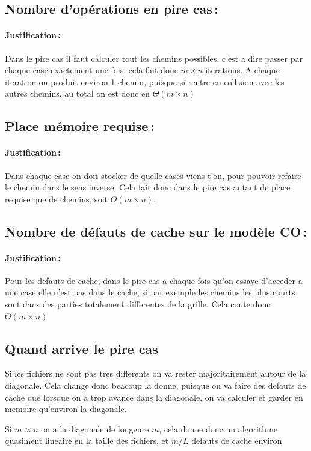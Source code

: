 \documentclass[a4paper,10pt,french]{article}
\begin{document}
  \subsection{Nombre  d'opérations en pire cas\,: }
    \paragraph{Justification\,: }
	Dans le pire cas il faut calculer tout les chemins possibles, c'est a dire passer par chaque case exactement une fois, cela fait donc $m\times n$ iterations. A chaque iteration on produit environ 1 chemin, puisque si rentre en collision avec les autres chemins, au total on est donc en $\Theta(m\times n)$
  \subsection{Place mémoire requise\,: }
    \paragraph{Justification\,: }
	Dans chaque case on doit stocker de quelle cases viens t'on, pour pouvoir refaire le chemin dans le sens inverse. Cela fait donc dans le pire cas autant de place requise que de chemins, soit $\Theta(m\times n)$.
  \subsection{Nombre de défauts de cache sur le modèle CO\,: }
    \paragraph{Justification\,: }
	Pour les defauts de cache, dans le pire cas a chaque fois qu'on essaye d'acceder a une case elle n'est pas dans le cache, si par exemple les chemins les plus courts sont dans des parties totalement differentes de la grille. Cela coute donc $\Theta(m\times n)$

	\subsection{Quand arrive le pire cas}
{
	Si les fichiers ne sont pas tres differents on va rester majoritairement autour de la diagonale. Cela change donc beacoup la donne, puisque on va faire des defauts de cache que lorsque on a trop avance dans la diagonale, on va calculer et garder en memoire qu'environ la diagonale.

	Si $m\approx n$ on a la diagonale de longeure $m$, cela donne donc un algorithme quasiment lineaire en la taille des fichiers, et $m/L$ defauts de cache environ
}
\end{document}
